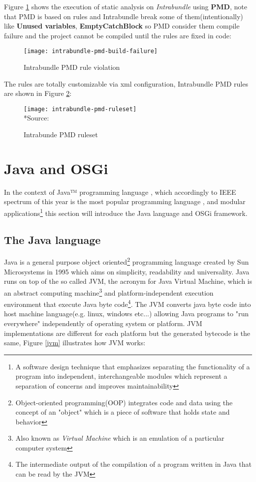 \FloatBarrier

Figure \ref{pmd violation} shows the execution of static analysis on \textit{Intrabundle} using \textbf{PMD}, note that PMD is based on rules and Intrabundle break some of them(intentionally) like \textbf{Unused variables}, \textbf{EmptyCatchBlock} so PMD consider them compile failure and the project cannot be compiled until the rules are fixed in code:

\begin{figure}[h]
\label{pmd violation}
\caption{Intrabundle PMD rule violation}
\centering
\texttt{[image: intrabundle-pmd-build-failure]}
\end{figure}

\FloatBarrier

The rules are totally customizable via xml configuration, Intrabundle PMD rules are shown in Figure \ref{pmd ruleset}:

\begin{figure}[h]
\label{pmd ruleset}
\caption{Intrabunde PMD ruleset}
\centering
\texttt{[image: intrabundle-pmd-ruleset]}
\\*Source: \cite{intrabundle pmd 2014}
\end{figure}

\FloatBarrier

\section{Java and OSGi}

In the context of Java™ programming language \citep{Arnold 2005}, which accordingly to IEEE spectrum of this year is the most popular programming language \citep{ieee spectrum 2014}, and modular applications\footnote{A software design technique that emphasizes separating the functionality of a program into independent, interchangeable modules which represent a separation of concerns and improves maintainability} this section will introduce the Java language and OSGi framework.

\subsection{The Java language}
Java is a general purpose object oriented\footnote{Object-oriented programming(OOP) integrates code and data using the concept of an "object" which is a piece of software that holds state and behavior} programming language created by Sun Microsystems in 1995 which aims on simplicity, readability and universality. Java runs on top of the so called JVM, the acronym for Java Virtual Machine, which is an abstract computing machine\footnote{Also known as \textit{Virtual Machine} which is an emulation of a particular computer system} and platform-independent execution environment that execute Java byte code\footnote{The intermediate output of the compilation of a program written in Java that can be read by the JVM}. The JVM converts java byte code into host machine language(e.g. linux, windows etc...) allowing Java programs to "run everywhere" independently of operating system or platform. JVM implementations are different for each platform but the generated bytecode is the same, Figure \ref{jvm} illustrates how JVM works:

